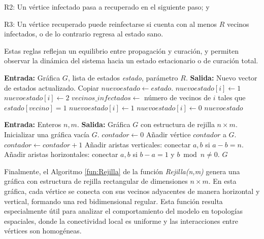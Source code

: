 \documentclass[12pt,titlepage,twoside,openright]{book}
\begin{document}
R2: Un v\'ertice infectado pasa a recuperado en el siguiente paso; y

R3: Un v\'ertice recuperado puede reinfectarse si cuenta con al menos $R$ vecinos infectados, o de lo contrario regresa al estado sano.

Estas reglas reflejan un equilibrio entre propagaci\'on y curaci\'on, y permiten observar la din\'amica del sistema hacia un estado estacionario o de curaci\'on total.
\newpage
\begin{algorithm}[h]
\caption{Paso($G$, \textit{estado}, $R$)}
\label{fun:Paso}
\begin{algorithmic}[1]
\State \textbf{Entrada:} Gr\'afica $G$, lista de estados \textit{estado}, par\'ametro $R$.
\State \textbf{Salida:} Nuevo vector de estados actualizado.
\State Copiar $nuevoestado \gets estado$.
            \State $nuevoestado[i] \gets 1$
        \EndIf
        \State $nuevoestado[i] \gets 2$
        \State $vecinos\_infectados \gets$ n\'umero de vecinos de $i$ tales que $estado[vecino] = 1$
            \State $nuevoestado[i] \gets 1$
        \Else
            \State $nuevoestado[i] \gets 0$
        \EndIf
    \EndIf
\EndFor
\State \Return $nuevoestado$
\end{algorithmic}
\end{algorithm}

\begin{algorithm}[H]
\caption{Rejilla($n$, $m$)}
\label{fun:Rejilla}
\begin{algorithmic}[1]
\State \textbf{Entrada:} Enteros $n, m$.
\State \textbf{Salida:} Gr\'afica $G$ con estructura de rejilla $n \times m$.
\State Inicializar una gr\'afica vac\'ia $G$.
\State $contador \gets 0$
        \State A\~nadir v\'ertice $contador$ a $G$.
        \State $contador \gets contador + 1$
    \EndFor
\EndFor
\State A\~nadir aristas verticales: conectar $a,b$ si $a-b = n$.
\State A\~nadir aristas horizontales: conectar $a,b$ si $b-a = 1$ y $b \bmod n \neq 0$.
\State \Return $G$
\end{algorithmic}
\end{algorithm}

Finalmente, el Algoritmo \ref{fun:Rejilla} de la funci\'on \textit{Rejilla(n,m)} genera una gr\'afica con estructura de rejilla rectangular de dimensiones $n \times m$. En esta gr\'afica, cada v\'ertice se conecta con sus vecinos adyacentes de manera horizontal y vertical, formando una red bidimensional regular. Esta funci\'on resulta especialmente \'util para analizar el comportamiento del modelo en topolog\'ias espaciales, donde la conectividad local es uniforme y las interacciones entre v\'ertices son homog\'eneas.
\end{document}

